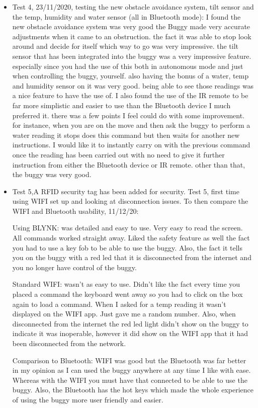 \documentclass[8pt, a4paper]{article}
\begin{document}
\begin{itemize}
\item Test 4, 23/11/2020, testing the new obstacle avoidance system, tilt sensor and the temp, humidity and water sensor (all in Bluetooth mode): I found the new obstacle avoidance system was very good the Buggy made very accurate adjustments when it came to an obstruction. the fact it was able to stop look around and decide for itself which way to go was very impressive. the tilt sensor that has been integrated into the buggy was a very impressive feature. especially since you had the use of this both in autonomous mode and just when controlling the buggy, yourself. also having the bonus of a water, temp and humidity sensor on it was very good. being able to see those readings was a nice feature to have the use of. I also found the use of the IR remote to be far more simplistic and easier to use than the Bluetooth device I much preferred it. there was a few points I feel could do with some improvement. for instance, when you are on the move and then ask the buggy to perform a water reading it stops does this command but then waits for another new instructions. I would like it to instantly carry on with the previous command once the reading has been carried out with no need to give it further instruction from either the Bluetooth device or IR remote. other than that, the buggy was very good.

\item Test 5,A RFID security tag has been added for security. 
Test 5, first time using WIFI set up and looking at disconnection issues. To then compare the WIFI and Bluetooth usability, 11/12/20: 

Using BLYNK: was detailed and easy to use. Very easy to read the screen. All commands worked straight away. Liked the safety feature as well the fact you had to use a key fob to be able to use the buggy. Also, the fact it tells you on the buggy with a red led that it is disconnected from the internet and you no longer have control of the buggy. 

Standard WIFI:  wasn’t as easy to use. Didn’t like the fact every time you placed a command the keyboard went away so you had to click on the box again to load a command. When I asked for a temp reading it wasn’t displayed on the WIFI app. Just gave me a random number. Also, when disconnected from the internet the red led light didn’t show on the buggy to indicate it was inoperable, however it did show on the WIFI app that it had been disconnected from the network.  

Comparison to Bluetooth: WIFI was good but the Bluetooth was far better in my opinion as I can used the buggy anywhere at any time I like with ease. Whereas with the WIFI you must have that connected to be able to use the buggy. Also, the Bluetooth has the hot keys which made the whole experience of using the buggy more user friendly and easier. 


\end{itemize}
\end{document}
